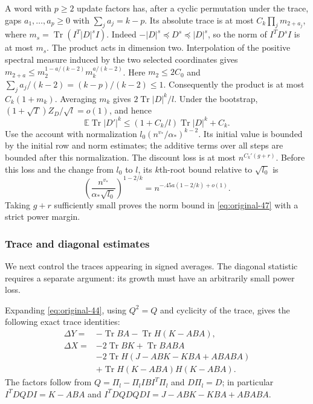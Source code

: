 A word with $p\ge2$ update factors has, after a cyclic permutation
under the trace, gaps $a_1,\ldots,a_p\ge0$ with
$\sum_ja_j=k-p$.  Its absolute trace is at most
$C_k\prod_jm_{2+a_j}$, where
$m_s=\operatorname{Tr}(I^T|D|^sI)$.
Indeed $-|D|^s\preceq D^s\preceq |D|^s$, so the norm of
$I^TD^sI$ is at most $m_s$.  The product acts in dimension two.  Interpolation of the
positive spectral measure induced by the two selected coordinates
gives
$m_{2+a}\le m_2^{1-a/(k-2)}m_k^{a/(k-2)}$.
Here $m_2\le2C_0$ and
$\sum_ja_j/(k-2)=(k-p)/(k-2)\le1$.  Consequently the product is
at most $C_k(1+m_k)$.
Averaging $m_k$ gives $2\operatorname{Tr}|D|^k/l$.  Under the
bootstrap, $(1+\sqrt T)Z_D/\sqrt l=o(1)$, and hence
\[
 \mathbb E\operatorname{Tr}|D'|^k
 \le(1+C_k/l)\operatorname{Tr}|D|^k+C_k.
\]
Use the account with normalization
$l_0(n^{v_*}/\alpha_*)^{k-2}$.
Its initial value is bounded by the initial row and norm estimates;
the additive terms over all steps are bounded after this normalization.
The discount loss is at most $n^{C_k'(g+r)}$.
Before this loss and the change from $l_0$ to $l$, its $k$th-root
bound relative to $\sqrt{l_0}$ is
\[
 \left(\frac{n^{v_*}}{\alpha_*\sqrt{l_0}}\right)^{1-2/k}
 =n^{-.45a(1-2/k)+o(1)}.
\]
Taking $g+r$ sufficiently small proves the norm bound in
\eqref{eq:original-47} with a strict power margin.

\subsubsection*{Trace and diagonal estimates}
We next control the traces appearing in signed averages.  The diagonal
statistic requires a separate argument: its growth must have an
arbitrarily small power loss.

Expanding \eqref{eq:original-44}, using $Q^2=Q$ and cyclicity of
the trace, gives the following exact trace identities:
\begin{equation}
 \begin{split}
 \Delta Y={}&-\operatorname{Tr}BA
                  -\operatorname{Tr}H(K-ABA),\\
 \Delta X={}&-2\operatorname{Tr}BK+\operatorname{Tr}BABA\\
 &-2\operatorname{Tr}H(J-ABK-KBA+ABABA)\\
 &+\operatorname{Tr}H(K-ABA)H(K-ABA).
 \end{split}
 \label{eq:original-48}
\end{equation}
The factors follow from
$Q=\Pi_l-\Pi_lIBI^T\Pi_l$ and $D\Pi_l=D$; in particular
$I^TDQD I=K-ABA$ and
$I^TDQDQDI=J-ABK-KBA+ABABA$.


